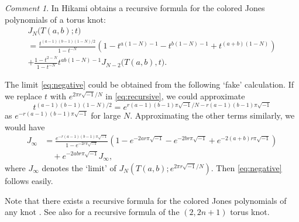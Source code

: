 \documentclass[a4paper,draft]{amsart}
\theoremstyle{plain}
\theoremstyle{definition}
\theoremstyle{remark}
\newtheorem{com}[thm]{Comment}
\numberwithin{equation}{section}
\begin{document}
\begin{com}
In \cite[Theorem 4]{Hikami:2004} Hikami obtains a recursive formula for
the colored Jones polynomials of a torus knot:
\begin{multline}\label{eq:recursive}
  J_N\bigl(T(a,b);t\bigr)
  \\
  =
  \frac{t^{(a-1)(b-1)(1-N)/2}}{1-t^{-N}}
  \left(
    1-t^{a(1-N)-1}-t^{b(1-N)-1}+t^{(a+b)(1-N)}
  \right)
  \\
  +
  \frac{1-t^{2-N}}{1-t^{-N}}
  t^{ab(1-N)-1}
  J_{N-2}\bigl(T(a,b),t\bigr).
\end{multline}
\par
The limit \eqref{eq:negative} could be obtained from the following `fake'
calculation.
If we replace $t$ with $e^{2\pi{r}\sqrt{-1}/N}$
in \eqref{eq:recursive}, we could approximate
\begin{equation*}
  t^{(a-1)(b-1)(1-N)/2}
  =
  e^{r(a-1)(b-1)\pi\sqrt{-1}/N-r(a-1)(b-1)\pi\sqrt{-1}}
\end{equation*}
as $e^{-r(a-1)(b-1)\pi\sqrt{-1}}$ for large $N$.
Approximating the other terms similarly, we would have
\begin{equation*}
\begin{split}
  J_{\infty}
  &=
  \frac{e^{-r(a-1)(b-1)\pi\sqrt{-1}}}{1-e^{-2r\pi\sqrt{-1}}}
  \left(
    1-e^{-2ar\pi\sqrt{-1}}-e^{-2br\pi\sqrt{-1}}+e^{-2(a+b)r\pi\sqrt{-1}}
  \right)
  \\
  &\quad+
  e^{-2abr\pi\sqrt{-1}}J_{\infty},
\end{split}
\end{equation*}
where $J_{\infty}$ denotes the `limit' of
$J_N\left(T(a,b);e^{2\pi{r}\sqrt{-1}/N}\right)$.
Then \eqref{eq:negative} follows easily.
\par
Note that there exists a recursive formula for the colored Jones polynomials of
any knot \cite{Garoufalidis/Le:2003}.
See also \cite{Gelca:PROAM2002,Gelca/Sain:JKNOT2003} for a recursive formula
of the $(2,2n+1)$ torus knot.
\end{com}


\end{document}
